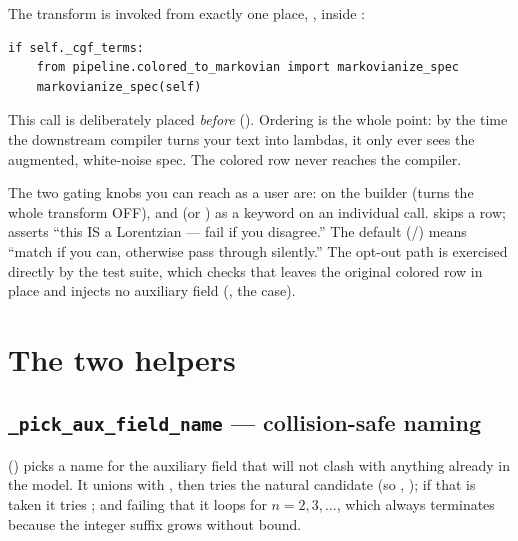 The transform is invoked from exactly one place,
, inside :

\begin{lstlisting}
if self._cgf_terms:
    from pipeline.colored_to_markovian import markovianize_spec
    markovianize_spec(self)
\end{lstlisting}

This call is deliberately placed \emph{before} 
(). Ordering is the whole point: by the time the
downstream compiler turns your text into lambdas, it only ever sees the augmented,
white-noise spec. The colored row never reaches the compiler.

\begin{note}
The two gating knobs you can reach as a user are:  on
the builder (turns the whole transform OFF), and  (or
) as a keyword on an individual  call.
 skips a row;  asserts ``this IS a Lorentzian --- fail if
you disagree.'' The default (/) means ``match if you can,
otherwise pass through silently.'' The opt-out path is exercised directly by the
test suite, which checks that  leaves the original
colored row in place and injects no auxiliary field
(, the
 case).
\end{note}

\section{The two helpers}

\subsection{\texttt{\_pick\_aux\_field\_name} --- collision-safe naming}
\label{sec:cm-pickname}

() picks a name for the auxiliary
field that will not clash with anything already in the model. It unions
 with , then tries the natural candidate
 (so , ); if that is taken it
tries ; and failing that it loops
 for $n = 2, 3, \dots$, which always terminates
because the integer suffix grows without bound.

